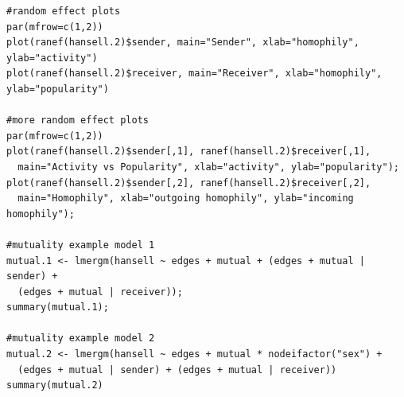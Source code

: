 \documentclass[a4paper]{article}
\begin{document}
\begin{appendices}
\begin{verbatim}
#random effect plots
par(mfrow=c(1,2))
plot(ranef(hansell.2)$sender, main="Sender", xlab="homophily", ylab="activity")
plot(ranef(hansell.2)$receiver, main="Receiver", xlab="homophily", ylab="popularity")

#more random effect plots
par(mfrow=c(1,2))
plot(ranef(hansell.2)$sender[,1], ranef(hansell.2)$receiver[,1], 
  main="Activity vs Popularity", xlab="activity", ylab="popularity");
plot(ranef(hansell.2)$sender[,2], ranef(hansell.2)$receiver[,2], 
  main="Homophily", xlab="outgoing homophily", ylab="incoming homophily");

#mutuality example model 1
mutual.1 <- lmergm(hansell ~ edges + mutual + (edges + mutual | sender) + 
  (edges + mutual | receiver));  
summary(mutual.1);

#mutuality example model 2
mutual.2 <- lmergm(hansell ~ edges + mutual * nodeifactor("sex") + 
  (edges + mutual | sender) + (edges + mutual | receiver))
summary(mutual.2)  

\end{verbatim}



\end{appendices}


	
\end{document}
